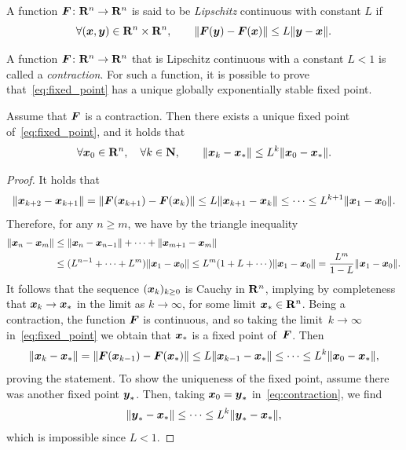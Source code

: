 \begin{definition}
    A function $\mathbf{\boldsymbol{F}}\colon \mathbf R^n \to \mathbf R^n$ is said to be \emph{Lipschitz} continuous
    with constant $L$ if
    \[
        \forall (\vect x, \vect y) \in \real^n \times \real^n, \qquad
        \norm[big]{\vect F(\vect y) - \vect F(\vect x)} \leq L \norm{\vect y - \vect x}.
    \]
\end{definition}
A function $\mathbf{\boldsymbol{F}}\colon \mathbf R^n \to \mathbf R^n$ that is Lipschitz continuous with a constant $L < 1$ is called a \emph{contraction}.
For such a function, it is possible to prove that~\eqref{eq:fixed_point} has a unique globally exponentially stable fixed point.
\begin{theorem}
    \label{theorem:exponenital_convergence_fixed_point}
    Assume that $\mathbf{\boldsymbol{F}}$ is a contraction.
    Then there exists a unique fixed point of~\eqref{eq:fixed_point},
    and it holds that
    \[
        \forall \mathbf{\boldsymbol{x}}_0 \in \mathbf R^n,
        \quad \forall k \in \mathbf N, \qquad
        \lVert\mathbf{\boldsymbol{x}}_k - \mathbf{\boldsymbol{x}}_*\rVert \leq L^k \lVert\mathbf{\boldsymbol{x}}_0 - \mathbf{\boldsymbol{x}}_*\rVert.
    \]
\end{theorem}
\begin{proof}
    It holds that
    \[
        \norm[big]{\vect x_{k+2} - \vect x_{k+1}}
        = \norm[big]{\vect F(\vect x_{k+1}) - \vect F(\vect x_k)}
        \leq L\norm{\vect x_{k+1} - \vect x_k}
        \leq \dots \leq L^{k+1} \norm{\vect x_{1} - \vect x_0}.
    \]
    Therefore, for any $n \geq m$,
    we have by the triangle inequality
    \begin{align*}
        \lVert\mathbf{\boldsymbol{x}}_{n} - \mathbf{\boldsymbol{x}}_{m}\rVert
        &\leq \lVert\mathbf{\boldsymbol{x}}_{n} - \mathbf{\boldsymbol{x}}_{n-1}\rVert + \dotsb + \lVert\mathbf{\boldsymbol{x}}_{m+1} - \mathbf{\boldsymbol{x}}_{m}\rVert \\
        &\leq (L^{n-1} + \dotsb + L^{m}) \lVert\mathbf{\boldsymbol{x}}_{1} - \mathbf{\boldsymbol{x}}_0\rVert
        \leq L^{m} (1 + L + \dotsb) \lVert\mathbf{\boldsymbol{x}}_{1} - \mathbf{\boldsymbol{x}}_0\rVert
        = \frac{L^{m}}{1-L} \lVert\mathbf{\boldsymbol{x}}_{1} - \mathbf{\boldsymbol{x}}_0\rVert.
    \end{align*}
    It follows that the sequence $(\mathbf{\boldsymbol{x}}_k)_{k\geq0}$ is Cauchy in $\mathbf R^n$,
    implying by completeness that $\mathbf{\boldsymbol{x}}_k \to \mathbf{\boldsymbol{x}}_*$ in the limit as $k \to \infty$,
    for some limit $\mathbf{\boldsymbol{x}}_* \in \mathbf R^n$.
    Being a contraction, the function $\mathbf{\boldsymbol{F}}$ is continuous,
    and so taking the limit~$k \to \infty$ in~\eqref{eq:fixed_point} we obtain that $\mathbf{\boldsymbol{x}}_*$ is a fixed point of~$\mathbf{\boldsymbol{F}}$.
    Then
    \begin{equation}
        \label{eq:contraction}
        \norm[big]{\vect x_{k} - \vect x_{*}}
        = \norm[big]{\vect F(\vect x_{k-1}) - \vect F(\vect x_*)}
        \leq L\norm{\vect x_{k-1} - \vect x_*}
        \leq \dots \leq L^{k} \norm{\vect x_{0} - \vect x_*},
    \end{equation}
    proving the statement.
    To show the uniqueness of the fixed point,
    assume there was another fixed point $\mathbf{\boldsymbol{y}}_*$.
    Then, taking $\mathbf{\boldsymbol{x}}_0 = \mathbf{\boldsymbol{y}}_*$ in~\eqref{eq:contraction},
    we find
    \begin{equation*}
        \norm[big]{\vect y_* - \vect x_{*}}
        \leq \dots \leq L^{k} \norm{\vect y_* - \vect x_*},
    \end{equation*}
    which is impossible since $L < 1$.
\end{proof}
